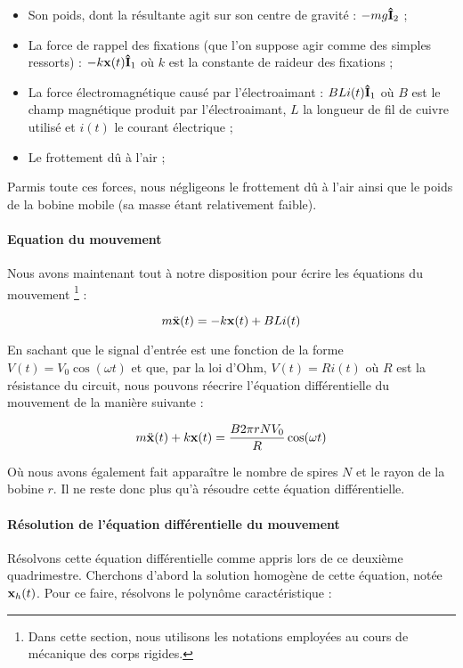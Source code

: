 \begin{itemize}
	\item Son poids, dont la résultante agit sur son centre de gravité : $-mg{\bf\hat{ I}}_2$ ;
	\item La force de rappel des fixations (que l'on suppose agir comme des simples
	ressorts) : $-k {\bf x}(t) {\bf\hat{ I}}_1$ où $k$ est la constante de raideur des fixations ;
	\item La force électromagnétique causé par l'électroaimant : $BLi(t) {\bf\hat{ I}}_1$ où
	$B$ est le champ magnétique produit par l'électroaimant, $L$ la longueur de fil de cuivre
	utilisé et $i(t)$ le courant électrique ;
	\item Le frottement dû à l'air ;
\end{itemize}

Parmis toute ces forces, nous négligeons le frottement dû à l'air ainsi que le poids
de la bobine mobile (sa masse étant relativement faible).

\paragraph{Equation du mouvement}
Nous avons maintenant tout à notre disposition pour écrire les équations du mouvement
\footnote{Dans cette section, nous utilisons les notations employées au cours de
mécanique des corps rigides.} :

$$m\ddot{\bf x}(t) = -k{\bf x}(t) + BLi(t)$$

En sachant que le signal d'entrée est une fonction de la forme $V(t) = V_0 \cos (\omega t)$ et
que, par la loi d'Ohm, $V(t) = Ri(t)$ où $R$ est la résistance du circuit, 
nous pouvons réecrire l'équation différentielle du mouvement de la manière suivante :

$$m\ddot{\bf x}(t) + k{\bf x}(t) = \frac{B2\pi rNV_0}{R}\cos (\omega t)$$

Où nous avons également fait apparaître le nombre de spires $N$ et le rayon de la bobine
$r$. Il ne reste donc plus qu'à résoudre cette équation différentielle.

\paragraph{Résolution de l'équation différentielle du mouvement}
Résolvons cette équation différentielle comme appris lors de ce deuxième
quadrimestre. Cherchons d'abord la solution homogène de cette équation, notée ${\bf x}_h(t)$.
Pour ce faire, résolvons le polynôme caractéristique :

